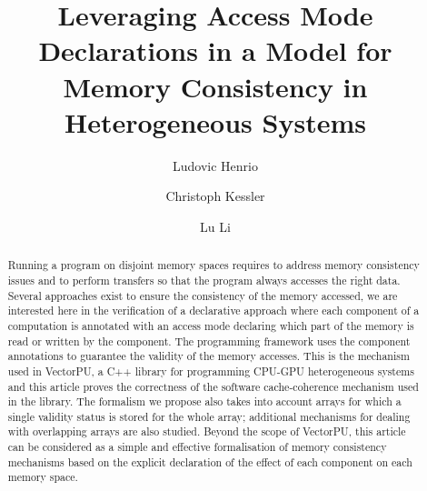 \documentclass[preprint,12pt]{elsarticle}
\begin{document}
\begin{frontmatter}


\title{Leveraging Access Mode 
Declarations in a Model for Memory Consistency in Heterogeneous Systems }


\author[i3s]{Ludovic Henrio}
\author[liu]{Christoph Kessler}
\author[liu]{Lu Li}

\address[i3s]{Universit\'e~C\^ote~d'Azur, CNRS, I3S, France.}
\address[liu]{University of Linköping, Sweden}

\begin{abstract}
Running a program on disjoint memory spaces requires to address memory consistency 
issues and to perform  transfers so that the program always accesses  the right 
data. Several approaches exist to ensure the consistency of the memory accessed,  we 
are interested here in the verification of a declarative approach where each component of 
a computation is annotated with an access mode declaring which part of the memory is 
read or written by the component. The programming framework uses the component
annotations to guarantee the validity of the memory accesses. This is the mechanism used in VectorPU, a C++ library for programming CPU-GPU heterogeneous  systems 
and this article proves the correctness of the software cache-coherence mechanism used in 
the library.  The formalism we propose also takes into account arrays for which a single validity status is stored for the whole array; additional mechanisms for dealing with overlapping arrays are also studied. Beyond the scope of VectorPU, this article can be considered as a simple 
and effective formalisation of memory consistency mechanisms based on the explicit 
declaration of the effect of each component on each memory space.


\end{abstract}
\end{frontmatter}
\end{document}

